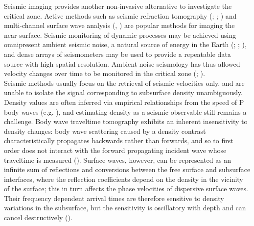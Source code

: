 \documentclass[]{article}
\begin{document}
	
	Seismic imaging provides another non-invasive alternative to investigate the critical zone. Active methods such as seismic refraction tomography (\cite{befus2011seismic}; \cite{nielson2021effect}; \cite{flinchum2022p}) and multi-channel surface wave analysis (\cite{handoyo2022geophysical}, \cite{trichandi2022combined}) are popular methods for imaging the near-surface. Seismic monitoring of dynamic processes may be achieved using omnipresent ambient seismic noise, a natural source of energy in the Earth (\cite{curtis2006seismic}; \cite{obermann2015potential}; \cite{nakata2019seismic}), and dense arrays of seismometers may be used to provide a repeatable data source with high spatial resolution. Ambient noise seismology has thus allowed velocity changes over time to be monitored in the critical zone (\cite{james2019insights}; \cite{oakley2021seismic}). \\
	
	Seismic methods usually focus on the retrieval of seismic velocities only, and are unable to isolate the signal corresponding to subsurface density unambiguously. Density values are often inferred via empirical relationships from the speed of P body-waves (e.g. \cite{gardner1974formation}), and estimating density as a seismic observable still remains a challenge. Body wave traveltime tomography exhibits an inherent insensitivity to density changes: body wave scattering caused by a density contrast characteristically propagates backwards rather than forwards, and so to first order does not interact with the forward propagating incident wave whose traveltime is measured (\cite{fichtner2010full}). Surface waves, however, can be represented as an infinite sum of reflections and conversions between the free surface and subsurface interfaces, where the reflection coefficients depend on the density in the vicinity of the surface; this in turn affects the phase velocities of dispersive surface waves. Their frequency dependent arrival times are therefore sensitive to density variations in the subsurface, but the sensitivity is oscillatory with depth and can cancel destructively (\cite{takeuchi1972seismic}).\\
	
\end{document}
